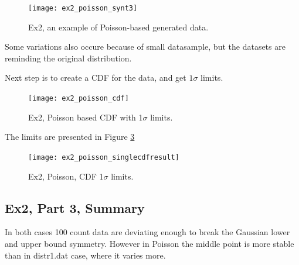 \documentclass{article}
\begin{document}
\begin{figure}[!hbt]
	\centering
	\texttt{[image: ex2\_poisson\_synt3]}
	\caption{Ex2, an example of Poisson-based generated data.}
	\label{fig:ex2_poisson_synt3}
\end{figure}

Some variations also occure because of small datasample, but the datasets are reminding the original distribution.


Next step is to create a CDF for the data, and get $1 \sigma$ limits.
\begin{figure}[!hbt]
	\centering
	\texttt{[image: ex2\_poisson\_cdf]}
	\caption{Ex2, Poisson based CDF with 1$\sigma$ limits.}
	\label{fig:ex2_poisson_cdf}
\end{figure}

The limits are presented in Figure \ref{fig:ex2_poisson_singlecdfresult}

\begin{figure}[!hbt]
	\centering
	\texttt{[image: ex2\_poisson\_singlecdfresult]}
	\caption{Ex2, Poisson, CDF 1$\sigma$ limits.}
	\label{fig:ex2_poisson_singlecdfresult}
\end{figure}


\clearpage
\subsection*{Ex2, Part 3, Summary}
In both cases 100 count data are deviating enough to break the Gaussian lower and upper bound symmetry. However in Poisson the middle point is more stable than in distr1.dat case, where it varies more.
\end{document}
